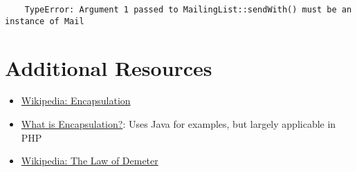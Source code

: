 \begin{verbatim}
    TypeError: Argument 1 passed to MailingList::sendWith() must be an instance of Mail
\end{verbatim}


\section{Additional Resources}

\begin{itemize}[leftmargin=*]
    \item \href{https://en.wikipedia.org/wiki/Encapsulation_(computer_programming)}{Wikipedia: Encapsulation}
    \item \href{https://stackify.com/oop-concept-for-beginners-what-is-encapsulation/}{What is Encapsulation?}: Uses Java for examples, but largely applicable in PHP
    \item \href{https://en.wikipedia.org/wiki/Law\_of\_Demeter}{Wikipedia: The Law of Demeter}
\end{itemize}
